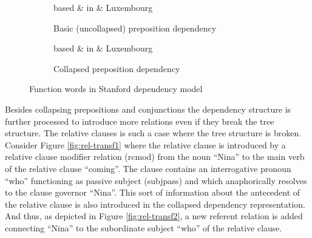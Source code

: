 \begin{figure}[!ht]
	\centering
	\begin{subfigure}{.45\textwidth}
        \centering
        \begin{dependency}
            \begin{deptext}[]
                based \& in \& Luxembourg\\
            \end{deptext}
        \end{dependency}
        \caption{Basic (uncollapsed) preposition dependency}
        \label{fig:prep-transf1}
    \end{subfigure}
	\quad
	\begin{subfigure}{.45\textwidth}
        \centering
        \begin{dependency}
            \begin{deptext}[]
                based \& in \& Luxembourg\\
            \end{deptext}
        \end{dependency}
        \caption{Collapsed preposition dependency}
        \label{fig:prep-transf2}
    \end{subfigure}
    \caption{Function words in Stanford dependency model}
    \label{fig:prep-transf}
\end{figure}

Besides collapsing prepositions and conjunctions the dependency structure is further processed to introduce more relations even if they break the tree structure. The relative clauses is such a case where the tree structure is broken. Consider Figure \ref{fig:rel-transf1} where the relative clause is introduced by a relative clause modifier relation (rcmod) from the noun ``Nina'' to the main verb of the relative clause ``coming''. The clause contains an interrogative pronoun ``who''  functioning as passive subject (subjpass) and which anaphorically resolves to the clause governor ``Nina''. This sort of information about the antecedent of the relative clause is also introduced in the collapsed dependency representation. And thus, as depicted in Figure \ref{fig:rel-transf2}, a new referent relation is added connecting ``Nina'' to the subordinate subject ``who'' of the relative clause.

